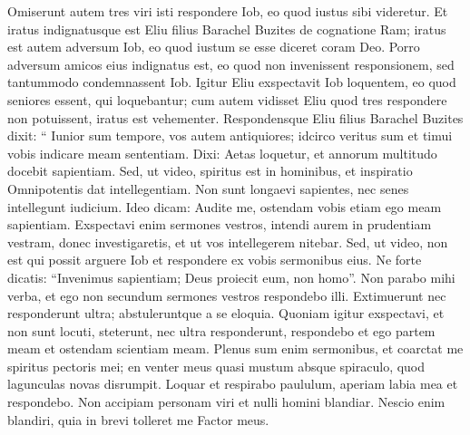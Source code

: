 \begin{biblechapter}
\begin{biblechapter}
\begin{biblechapter}
\begin{biblechapter}
\begin{biblechapter}
\begin{biblechapter}
\begin{biblechapter}
\begin{biblechapter}
\begin{biblechapter}
\begin{biblechapter}
\begin{biblechapter}
\begin{biblechapter}
\begin{biblechapter}
\begin{biblechapter}
\begin{biblechapter}
\begin{biblechapter}
\begin{biblechapter}
\begin{biblechapter}
\begin{biblechapter}
\begin{biblechapter}
\begin{biblechapter}
\begin{biblechapter}
\begin{biblechapter}
\begin{biblechapter}
\begin{biblechapter}
\begin{biblechapter}
\begin{biblechapter}
\begin{biblechapter}
\begin{biblechapter}
\begin{biblechapter}
\begin{biblechapter}
\begin{biblechapter}
\verse Omiserunt autem tres viri isti respondere Iob, eo quod iustus sibi videretur. 
\verse Et iratus indignatusque est Eliu filius Barachel Buzites de cognatione Ram; iratus est autem adversum Iob, eo quod iustum se esse diceret coram Deo. 
\verse Porro adversum amicos eius indignatus est, eo quod non invenissent responsionem, sed tantummodo condemnassent Iob. 
\verse Igitur Eliu exspectavit Iob loquentem, eo quod seniores essent, qui loquebantur; 
\verse cum autem vidisset Eliu quod tres respondere non potuissent, iratus est vehementer. 
 \verse Respondensque Eliu filius Barachel Buzites dixit:
 “ Iunior sum tempore,
 vos autem antiquiores;
 idcirco veritus sum et timui
 vobis indicare meam sententiam.
 \verse Dixi: Aetas loquetur,
 et annorum multitudo docebit sapientiam.
 \verse Sed, ut video, spiritus est in hominibus,
 et inspiratio Omnipotentis dat intellegentiam.
 \verse Non sunt longaevi sapientes,
 nec senes intellegunt iudicium.
 \verse Ideo dicam: Audite me,
 ostendam vobis etiam ego meam sapientiam.
 \verse Exspectavi enim sermones vestros,
 intendi aurem in prudentiam vestram, donec investigaretis,
 \verse et ut vos intellegerem nitebar.
 Sed, ut video, non est qui possit arguere Iob
 et respondere ex vobis sermonibus eius.
 \verse Ne forte dicatis: “Invenimus sapientiam;
 Deus proiecit eum, non homo”.
 \verse Non parabo mihi verba,
 et ego non secundum sermones vestros respondebo illi.
 \verse Extimuerunt nec responderunt ultra;
 abstuleruntque a se eloquia.
 \verse Quoniam igitur exspectavi, et non sunt locuti,
 steterunt, nec ultra responderunt,
 \verse respondebo et ego partem meam
 et ostendam scientiam meam.
 \verse Plenus sum enim sermonibus,
 et coarctat me spiritus pectoris mei;
 \verse en venter meus quasi mustum absque spiraculo,
 quod lagunculas novas disrumpit.
 \verse Loquar et respirabo paululum,
 aperiam labia mea et respondebo.
 \verse Non accipiam personam viri
 et nulli homini blandiar.
 \verse Nescio enim blandiri,
 quia in brevi tolleret me Factor meus.
 

\end{biblechapter}
\end{biblechapter}
\end{biblechapter}
\end{biblechapter}
\end{biblechapter}
\end{biblechapter}
\end{biblechapter}
\end{biblechapter}
\end{biblechapter}
\end{biblechapter}
\end{biblechapter}
\end{biblechapter}
\end{biblechapter}
\end{biblechapter}
\end{biblechapter}
\end{biblechapter}
\end{biblechapter}
\end{biblechapter}
\end{biblechapter}
\end{biblechapter}
\end{biblechapter}
\end{biblechapter}
\end{biblechapter}
\end{biblechapter}
\end{biblechapter}
\end{biblechapter}
\end{biblechapter}
\end{biblechapter}
\end{biblechapter}
\end{biblechapter}
\end{biblechapter}
\end{biblechapter}
